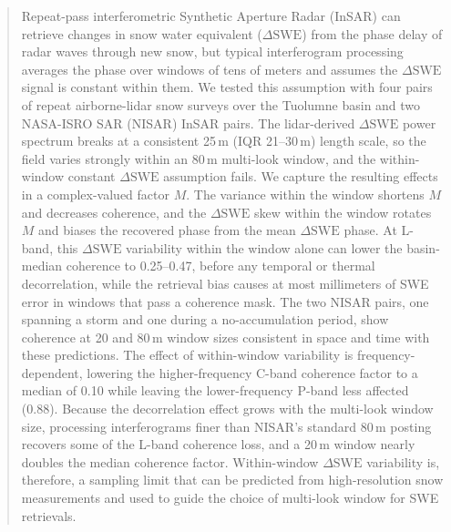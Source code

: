 \documentclass[tc, manuscript]{copernicus}
\begin{document}
\begin{abstract}
Repeat-pass interferometric Synthetic Aperture Radar (InSAR) can retrieve changes in snow water equivalent ($\Delta\mathrm{SWE}$) from the phase delay of radar waves through new snow, but typical interferogram processing averages the phase over windows of tens of meters and assumes the $\Delta\mathrm{SWE}$ signal is constant within them. We tested this assumption with four pairs of repeat airborne-lidar snow surveys over the Tuolumne basin and two NASA-ISRO SAR (NISAR) InSAR pairs. The lidar-derived $\Delta\mathrm{SWE}$ power spectrum breaks at a consistent 25\,\unit{m} (IQR 21--30\,\unit{m}) length scale, so the field varies strongly within an 80\,\unit{m} multi-look window, and the within-window constant $\Delta\mathrm{SWE}$ assumption fails. We capture the resulting effects in a complex-valued factor $M$. The variance within the window shortens $M$ and decreases coherence, and the $\Delta\mathrm{SWE}$ skew within the window rotates $M$ and biases the recovered phase from the mean $\Delta\mathrm{SWE}$ phase. At L-band, this $\Delta\mathrm{SWE}$ variability within the window alone can lower the basin-median coherence to 0.25--0.47, before any temporal or thermal decorrelation, while the retrieval bias causes at most millimeters of SWE error in windows that pass a coherence mask. The two NISAR pairs, one spanning a storm and one during a no-accumulation period, show coherence at 20 and 80\,\unit{m} window sizes consistent in space and time with these predictions. The effect of within-window variability is frequency-dependent, lowering the higher-frequency C-band coherence factor to a median of 0.10 while leaving the lower-frequency P-band less affected (0.88). Because the decorrelation effect grows with the multi-look window size, processing interferograms finer than NISAR's standard 80\,\unit{m} posting recovers some of the L-band coherence loss, and a 20\,\unit{m} window nearly doubles the median coherence factor. Within-window $\Delta\mathrm{SWE}$ variability is, therefore, a sampling limit that can be predicted from high-resolution snow measurements and used to guide the choice of multi-look window for SWE retrievals.
\end{abstract}


\end{document}
